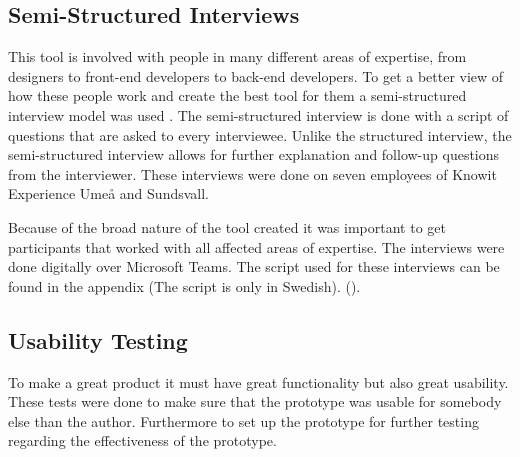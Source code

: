 






\subsection{Semi-Structured Interviews}%
\label{sub:inteviews}
This tool is involved with people in many different areas of expertise, from designers to front-end developers to back-end developers. To get a better view of how these people work and create the best tool for them a semi-structured interview model was used \cite{galletta2013mastering}. The semi-structured interview is done with a script of questions that are asked to every interviewee. Unlike the structured interview, the semi-structured interview allows for further explanation and follow-up questions from the interviewer. These interviews were done on seven employees of Knowit Experience Umeå and Sundsvall. 

Because of the broad nature of the tool created it was important to get participants that worked with all affected areas of expertise. The interviews were done digitally over Microsoft Teams. The script used for these interviews can be found in the appendix (The script is only in Swedish). ().






\subsection{Usability Testing}%
\label{sub:usertesting}
To make a great product it must have great functionality but also great usability. These tests were done to make sure that the prototype was usable for somebody else than the author. Furthermore to set up the prototype for further testing regarding the effectiveness of the prototype.

